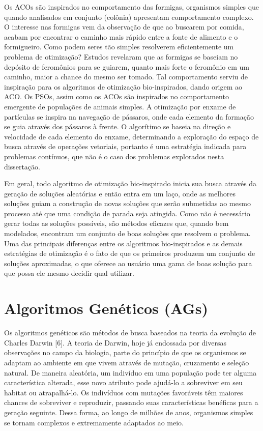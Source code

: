 Os ACOs são inspirados no comportamento das formigas, organismos simples que quando analisados em conjunto (colônia) apresentam comportamento complexo. O interesse nas formigas vem da observação de que ao buscarem por comida, acabam por encontrar o caminho mais rápido entre a fonte de alimento e o formigueiro. Como podem seres tão simples resolverem eficientemente um problema de otimização? Estudos revelaram que as formigas se baseiam no depósito de feromônios para se guiarem, quanto mais forte o feromônio em um caminho, maior a chance do mesmo ser tomado. Tal comportamento serviu de inspiração para os algoritmos de otimização bio-inspirados, dando origem ao ACO. Os PSOs, assim como os ACOs são inspirados no comportamento emergente de populações de animais simples. A otimização por enxame de partículas se inspira na navegação de pássaros, onde cada elemento da formação se guia através dos pássaros à frente. O algorítimo se baseia na direção e velocidade de cada elemento do enxame, determinando a exploração do espaço de busca através de operações vetoriais, portanto é uma estratégia indicada para problemas contínuos, que não é o caso dos problemas explorados nesta dissertação.

Em geral, todo algoritmo de otimização bio-inspirado inicia sua busca através da geração de soluções aleatórias e então entra em um laço, onde as melhores soluções guiam a construção de novas soluções que serão submetidas ao mesmo processo até que uma condição de parada seja atingida. Como não é necessário gerar todas as soluções possíveis, são métodos eficazes que, quando bem modelados, encontram um conjunto de boas soluções que resolvem o problema. Uma das principais diferenças entre os algoritmos bio-inspirados e as demais estratégias de otimização é o fato de que os primeiros produzem um conjunto de soluções aproximadas, o que oferece ao usuário uma gama de boas solução para que possa ele mesmo decidir qual utilizar.

\section{Algoritmos Genéticos (AGs)}
Os algoritmos genéticos são métodos de busca baseados na teoria da evolução de Charles Darwin [6]. A teoria de Darwin, hoje já endossada por diversas observações no campo da biologia, parte do princípio de que os organismos se adaptam ao ambiente em que vivem através de mutação, cruzamento e seleção natural. De maneira aleatória, um indivíduo em uma população pode ter alguma característica alterada, esse novo atributo pode ajudá-lo a sobreviver em seu habitat ou atrapalhá-lo. Os indivíduos com mutações favoráveis têm maiores chances de sobreviver e reproduzir, passando suas características benéficas para a geração seguinte. Dessa forma, ao longo de milhões de anos, organismos simples se tornam complexos e extremamente adaptados ao meio.

